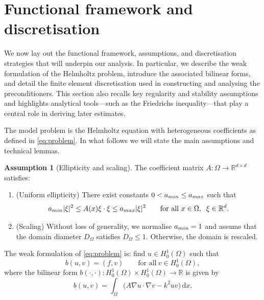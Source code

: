 \documentclass[preprint,3p,times]{elsarticle}
\newcommand{\rd}{\mathrm{d}}
\newcommand{\amin}{a_{\textup{\textsf{min}}}}
\newcommand{\amax}{a_{\textup{\textsf{max}}}}
\theoremstyle{definition}
\newtheorem{assumption}[theorem]{Assumption}
\numberwithin{equation}{section}
\begin{document}
\section{Functional framework and discretisation}
\label{sec:framework}
We now lay out the functional framework, assumptions, and discretisation strategies that will underpin our analysis. In particular, we describe the weak formulation of the Helmholtz problem, introduce the associated bilinear forms, and detail the finite element discretisation used in constructing and analysing the preconditioners. This section also recalls key regularity and stability assumptions and highlights analytical tools---such as the Friedrichs inequality---that play a central role in deriving later estimates.


The model problem is the Helmholtz equation with heterogeneous coefficients as defined in \eqref{eq:problem}. In what follows we will state the main assumptions and technical lemmas.

\begin{assumption}[Ellipticity and scaling]\label{ass:A}
The coefficient matrix $A:\Omega \to \mathbb{R}^{d\times d}$ satisfies:
\begin{enumerate}
\item[\textup{(i)}] (Uniform ellipticity)
	There exist constants $0<\amin\le\amax$ such that
	\[
		\amin |\xi|^2 \le A(x)\xi\cdot\xi \le \amax |\xi|^2
		\qquad \text{for all} \ x\in\Omega, \;\; \xi\in\mathbb{R}^d.
	\]
\item[\textup{(ii)}] (Scaling) 
	Without loss of generality, we normalise $\amin=1$ and assume that the domain diameter $D_\Omega$
	satisfies $D_\Omega \le 1$.  Otherwise, the domain is rescaled.
\end{enumerate}
\end{assumption}


The weak formulation of \eqref{eq:problem} is: find $u \in H^1_0(\Omega)$ such that
\begin{equation}
\label{eq:weak}
	b(u,v) = (f,v) \qquad \text{for all} \ v \in H^1_0(\Omega),
\end{equation}
where the bilinear form $b(\cdot,\cdot): H^1_0(\Omega)\times H^1_0(\Omega)\to\mathbb{R}$ is given by
\begin{equation}\label{eq:def_b}
	b(u,v) = \int_\Omega \bigl( A\nabla u\cdot\nabla v - k^2 uv \bigr)\,\rd x.
\end{equation}
\end{document}
